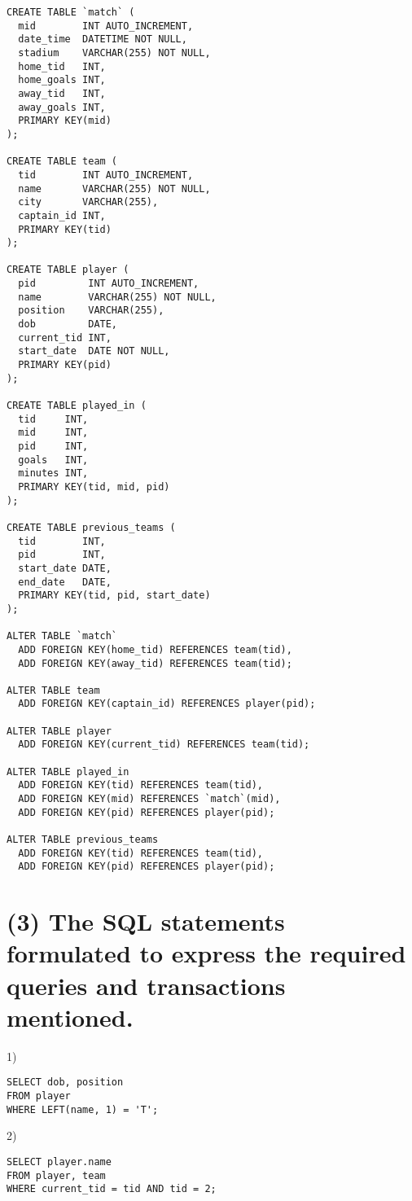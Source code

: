 \documentclass{article}
\begin{document}
\begin{lstlisting}
CREATE TABLE `match` (
  mid        INT AUTO_INCREMENT,
  date_time  DATETIME NOT NULL,
  stadium    VARCHAR(255) NOT NULL,
  home_tid   INT,
  home_goals INT,
  away_tid   INT,
  away_goals INT,
  PRIMARY KEY(mid)
);

CREATE TABLE team (
  tid        INT AUTO_INCREMENT,
  name       VARCHAR(255) NOT NULL,
  city       VARCHAR(255),
  captain_id INT,
  PRIMARY KEY(tid)
);

CREATE TABLE player (
  pid         INT AUTO_INCREMENT,
  name        VARCHAR(255) NOT NULL,
  position    VARCHAR(255),
  dob         DATE,
  current_tid INT,
  start_date  DATE NOT NULL,
  PRIMARY KEY(pid)
);

CREATE TABLE played_in (
  tid     INT,
  mid     INT,
  pid     INT,
  goals   INT,
  minutes INT,
  PRIMARY KEY(tid, mid, pid)
);

CREATE TABLE previous_teams (
  tid        INT,
  pid        INT,
  start_date DATE,
  end_date   DATE,
  PRIMARY KEY(tid, pid, start_date)
);

ALTER TABLE `match`
  ADD FOREIGN KEY(home_tid) REFERENCES team(tid),
  ADD FOREIGN KEY(away_tid) REFERENCES team(tid);

ALTER TABLE team
  ADD FOREIGN KEY(captain_id) REFERENCES player(pid);

ALTER TABLE player
  ADD FOREIGN KEY(current_tid) REFERENCES team(tid);

ALTER TABLE played_in
  ADD FOREIGN KEY(tid) REFERENCES team(tid),
  ADD FOREIGN KEY(mid) REFERENCES `match`(mid),
  ADD FOREIGN KEY(pid) REFERENCES player(pid);

ALTER TABLE previous_teams
  ADD FOREIGN KEY(tid) REFERENCES team(tid),
  ADD FOREIGN KEY(pid) REFERENCES player(pid);

\end{lstlisting}

\section{(3) The SQL statements formulated to express the required queries and transactions mentioned.}

1)
\begin{lstlisting}
SELECT dob, position
FROM player
WHERE LEFT(name, 1) = 'T';
\end{lstlisting}{}

2)
\begin{lstlisting}
SELECT player.name
FROM player, team
WHERE current_tid = tid AND tid = 2;
\end{lstlisting}{}
\end{document}
